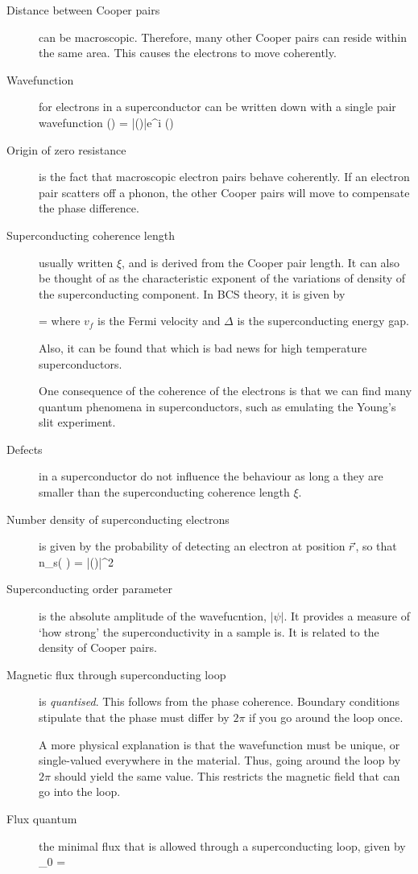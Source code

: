 \begin{description}
\item[Distance between Cooper pairs] can be macroscopic. Therefore, many other Cooper pairs can reside within the same area. This causes the electrons to move coherently. 

\item[Wavefunction] for electrons in a superconductor can be written down with a single pair wavefunction
\beq
\tilde{\psi}() = |\psi()|e^{i \theta ()}
\eeq

\item[Origin of zero resistance] is the fact that macroscopic electron pairs behave coherently. If an electron pair scatters off a phonon, the other Cooper pairs will move to compensate the phase difference. 

\item[Superconducting coherence length] usually written $\xi$, and is derived from the Cooper pair length. It can also be thought of as the characteristic exponent of the variations of density of the superconducting component. In BCS theory, it is given by 

\beq
\xi = 
\eeq
where $v_f$ is the Fermi velocity and $\Delta$ is the superconducting energy gap. 

Also, it can be found that 
\beq
\xi \propto {}
\eeq
which is bad news for high temperature superconductors. 

One consequence of the coherence of the electrons is that we can find many quantum phenomena in superconductors, such as emulating the Young's slit experiment. 

\item[Defects] in a superconductor do not influence the behaviour as long a they are smaller than the superconducting coherence length $\xi$. 

\item[Number density of superconducting electrons] is given by the probability of detecting an electron at position $\vec{r}$, so that 
\beq
n_s( ) = |\psi()|^2
\eeq

\item[Superconducting order parameter] is the absolute amplitude of the wavefucntion, $|\psi|$. It provides a measure of `how strong' the superconductivity in a sample is. It is related to the density of Cooper pairs. 

\item[Magnetic flux through superconducting loop] is \emph{quantised}. This follows from the phase coherence. Boundary conditions stipulate that the phase must differ by $2\pi$ if you go around the loop once. 

A more physical explanation is that the wavefunction must be unique, or single-valued everywhere in the material. Thus, going around the loop by $2\pi$ should yield the same value. This restricts the magnetic field that can go into the loop. 

\item[Flux quantum] the minimal flux that is allowed through a superconducting loop, given by 
\beq
\phi_0 = 
\eeq



\end{description}

